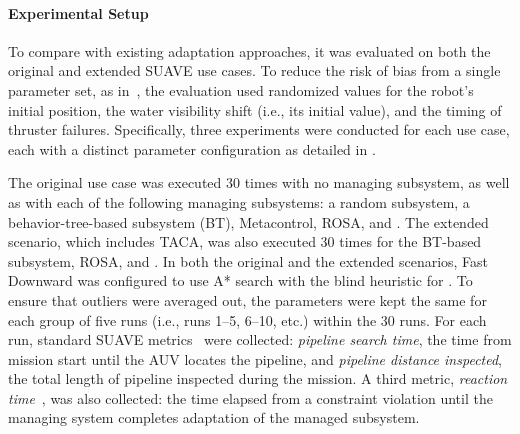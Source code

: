 \paragraph{Experimental Setup}
To compare \planta with existing adaptation approaches, it was evaluated on both the original and extended SUAVE use cases. To reduce the risk of bias from a single parameter set, as in~\cite{suave, rosa}, the evaluation used randomized values for the robot's initial position, the water visibility shift (i.e., its initial value), and the timing of thruster failures. Specifically, three experiments were conducted for each use case, each with a distinct parameter configuration as detailed in .

\begin{table}[tbp]
\centering
\caption{Parameter configuration for the SUAVE experiments, where $U(a,b)$ is a random uniform distribution from $a$ to $b$. The initial position is relative to the Gazebo reference frame, where $x$ is fixed at $-17.0$ and $z$ at $-18.5$. The time limit for each execution is set to $250$ seconds.}%
\label{planta:tab:suave_params}
\end{table}

The original use case was executed 30 times with no managing subsystem, as well as with each of the following managing subsystems: a random subsystem, a behavior-tree-based subsystem (BT), Metacontrol, ROSA, and \planta. The extended scenario, which includes TACA, was also executed 30 times for the BT-based subsystem, ROSA, and \planta. In both the original and the extended scenarios, Fast Downward was configured to use A* search with the blind heuristic for \planta. To ensure that outliers were averaged out, the parameters were kept the same for each group of five runs (i.e., runs 1–5, 6–10, etc.) within the 30 runs. For each run, standard SUAVE metrics~\cite{suave} were collected: \emph{pipeline search time}, the time from mission start until the AUV locates the pipeline, and \emph{pipeline distance inspected}, the total length of pipeline inspected during the mission. A third metric, \emph{reaction time}~\cite{rosa}, was also collected: the time elapsed from a constraint violation until the managing system completes adaptation of the managed subsystem.

